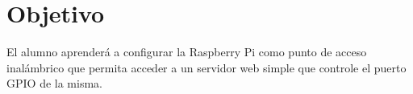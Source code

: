 %
%


\section{Objetivo}%
\label{sec:objective}
El alumno aprenderá a configurar la Raspberry Pi como punto de acceso inalámbrico que permita acceder a un servidor web simple que controle el puerto GPIO de la misma.%
